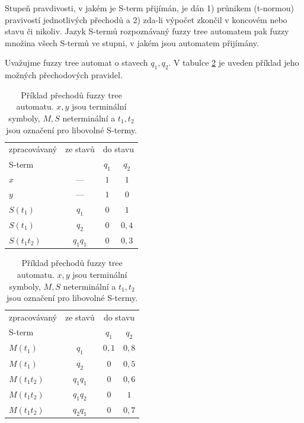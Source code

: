 
Stupeň pravdivosti, v jakém je S-term přijímán, je dán 1) průnikem (t-normou) pravivostí jednotlivých přechodů a 2) zda-li výpočet zkončil v koncovém nebo stavu či nikoliv. Jazyk S-termů rozpoznávaný fuzzy tree automatem pak fuzzy množina všech S-termů ve stupni, v jakém jsou automatem přijímány.

\begin{example}
  Uvažujme fuzzy tree automat o stavech $q_1, q_2$. V tabulce \ref{tab:FuzTreAutTrans} je uveden příklad jeho možných přechodových pravidel.
\end{example}

\begin{table}
  \begin{tabular}{|l|c||c|c|}
    \hline 
    zpracovávaný	& ze stavů	& \multicolumn{2}{|c|}{do stavu}	\\
    S-term		& 		& $q_1$		& $q_2$		\\
    \hline \hline
    $x$			& ---		& $1$		& $1$		\\
    \hline \hline
    $y$			& ---		& $1$		& $0$		\\
    \hline \hline
    $S(t_1)$		& $q_1$		& $0$		& $1$		\\
    $S(t_1)$		& $q_2$		& $0$		& $0{,}4$	\\
    $S(t_1 t_2)$	& $q_1 q_1$	& $0$		& $0{,}3$	\\  
    \hline
  \end{tabular} \hfill
  \begin{tabular}{|l|c||c|c|}
    \hline 
    zpracovávaný	& ze stavů	& \multicolumn{2}{|c|}{do stavu}	\\
    S-term		& 		& $q_1$		& $q_2$		\\
    \hline \hline
    $M(t_1)$		& $q_1$		& $0{,}1$	& $0{,}8$	\\
    $M(t_1)$		& $q_2$		& $0$		& $0{,}5$	\\
    $M(t_1 t_2)$	& $q_1 q_1$	& $0$		& $0{,}6$	\\
    $M(t_1 t_2)$	& $q_1 q_2$	& $0$		& $1$		\\
    $M(t_1 t_2)$	& $q_2 q_1$	& $0$		& $0{,}7$	\\ 
    \hline
  \end{tabular}
  
  \caption[Příklad přechodů fuzzy tree automatu]{Příklad přechodů fuzzy tree automatu. $x, y$ jsou terminální symboly, $M, S$ neterminální a $t_1, t_2$ jsou označení pro libovolné S-termy.} \label{tab:FuzTreAutTrans}
\end{table}

